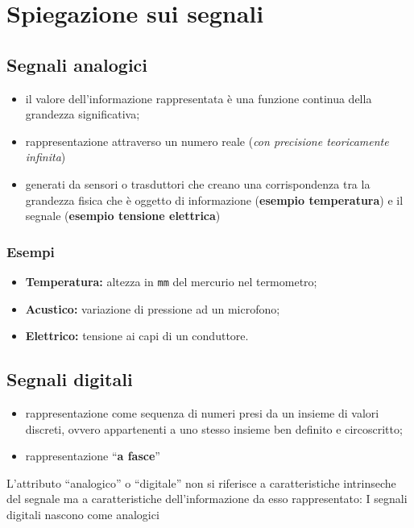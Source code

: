 \section{Spiegazione sui segnali}
\label{sec:spsegn}
\subsection{Segnali analogici}
\label{sec:sanalog}
\begin{itemize}
\item il valore dell'informazione rappresentata è una funzione continua
  della grandezza significativa;
\item rappresentazione attraverso un numero reale (\textit{con precisione
    teoricamente infinita})
\item generati da sensori o trasduttori che creano una corrispondenza tra
  la grandezza fisica che è oggetto di informazione (\textbf{esempio
    temperatura}) e il segnale (\textbf{esempio tensione elettrica})
\end{itemize}
\subsubsection{Esempi}
\begin{itemize}
	\item \textbf{Temperatura:} altezza in \texttt{mm} del mercurio nel
		termometro;
	\item \textbf{Acustico:} variazione di pressione ad un microfono;
	\item \textbf{Elettrico:} tensione ai capi di un conduttore.
\end{itemize}
\subsection{Segnali digitali}
\label{sec:sdigital}
\begin{itemize}
	\item rappresentazione come sequenza di numeri presi da un insieme di
		valori discreti, ovvero appartenenti a uno stesso insieme ben definito
		e circoscritto;
	\item rappresentazione ``{\bf a fasce}''
\end{itemize}
\begin{oss}
  L'attributo ``analogico'' o ``digitale'' non si riferisce a caratteristiche
  intrinseche del segnale ma a caratteristiche dell'informazione da esso rappresentato:
  {\color{red} I segnali digitali nascono come analogici}
\end{oss}

